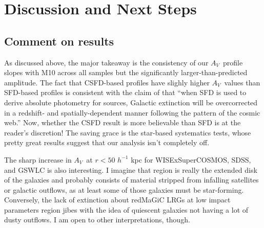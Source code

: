 \documentclass[11pt, oneside]{article}   	%
\newcommand{\av}{$A_V$~}
\newcommand{\hinv}{$h^{-1}$\xspace}
\begin{document}

\section{Discussion and Next Steps}\label{sec:discussion}
\subsection{Comment on results}

As discussed above, the major takeaway is the consistency of our \av profile slopes with M10 across all samples but the significantly larger-than-predicted amplitude. The fact that CSFD-based profiles have slighly higher \av values than SFD-based profiles is consistent with the claim of \cite{2023ApJ...958..118C} that ``when SFD is used to derive absolute photometry for sources, Galactic extinction will be overcorrected in a redshift- and spatially-dependent manner following the pattern of the cosmic web.'' Now, whether the CSFD result is more believable than SFD is at the reader's discretion! The saving grace is the star-based systematics tests, whose pretty great results suggest that our analysis isn't completely off. 

The sharp increase in \av at $r < 50$ \hinv kpc for WISExSuperCOSMOS, SDSS, and GSWLC is also interesting. I imagine that region is really the extended disk of the galaxies and probably consists of material stripped from infalling satellites or galactic outflows, as at least some of those galaxies must be star-forming. Conversely, the lack of extinction about redMaGiC LRGs at low impact parameters region jibes with the idea of quiescent galaxies not having a lot of dusty outflows. I am open to other interpretations, though.
\end{document}
